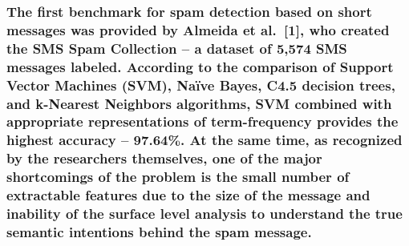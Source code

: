 \subsubsection{The first benchmark for spam detection based on short
messages was provided by Almeida et al.~{[}1{]}, who created the SMS
Spam Collection -- a dataset of 5,574 SMS messages labeled. According to
the comparison of Support Vector Machines (SVM), Naïve Bayes, C4.5
decision trees, and k-Nearest Neighbors algorithms, SVM combined with
appropriate representations of term-frequency provides the highest
accuracy -- 97.64\%. At the same time, as recognized by the researchers
themselves, one of the major shortcomings of the problem is the small
number of extractable features due to the size of the message and
inability of the surface level analysis to understand the true semantic
intentions behind the spam
message.}\label{the-first-benchmark-for-spam-detection-based-on-short-messages-was-provided-by-almeida-et-al.-1-who-created-the-sms-spam-collection-a-dataset-of-5574-sms-messages-labeled.-according-to-the-comparison-of-support-vector-machines-svm-nauxefve-bayes-c4.5-decision-trees-and-k-nearest-neighbors-algorithms-svm-combined-with-appropriate-representations-of-term-frequency-provides-the-highest-accuracy-97.64.-at-the-same-time-as-recognized-by-the-researchers-themselves-one-of-the-major-shortcomings-of-the-problem-is-the-small-number-of-extractable-features-due-to-the-size-of-the-message-and-inability-of-the-surface-level-analysis-to-understand-the-true-semantic-intentions-behind-the-spam-message.}

